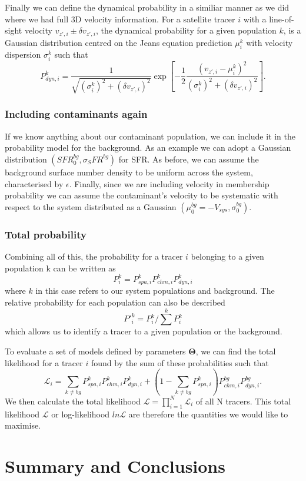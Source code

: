 Finally we can define the dynamical probability in a similiar manner as we did where we had full 3D velocity information. For a satellite tracer $i$ with a line-of-sight velocity $v_{z',i} \pm \delta v_{z',i}$, the dynamical probability for a given population $k$, is a Gaussian distribution centred on the Jeans equation prediction $\mu^k_i$ with velocity dispersion $\sigma^k_i$ such that
\begin{equation}
P^k_{dyn,i} = \frac{1}{\sqrt{(\sigma^k_i)^2+ (\delta v_{z',i})^2}} \exp{\left[-\frac{1}{2}\frac{(v_{z',i}-\mu^k_i)^2}{(\sigma^k_i)^2 + (\delta v_{z',i})^2}\right]}.
\end{equation}
\subsubsection{Including contaminants again}
If we know anything about our contaminant population, we can include it in the probability model for the background. As an example we can adopt a Gaussian distribution $(SFR_0^{bg},\sigma_SFR^{bg})$ for SFR. As before, we can assume the background surface number density to be uniform across the system, characterised by $\epsilon$. Finally, since we are including velocity in membership probability we can assume the contaminant's velocity to be systematic with respect to the system distributed as a Gaussian $(\mu_0^{bg}=-V_{sys},\sigma_0^{bg})$. 
\subsubsection{Total probability}
Combining all of this, the probability for a tracer $i$ belonging to a given population k can be written as
\begin{equation}
P_i^{k} = P_{spa,i}^k P_{chm,i}^k P_{dyn,i}^k 
\end{equation}
where $k$ in this case refers to our system populations and background. The relative probability for each population can also be described 
\begin{equation}
P'^k_i = P^k_i / \sum^k P^k_i
\end{equation}
which allows us to identify a tracer to a given population or the background.

To evaluate a set of models defined by parameters $\boldsymbol{\Theta}$, we can find the total likelihood for a tracer $i$ found by the sum of these probabilities such that
\begin{equation}
\mathcal{L}_i = \sum_{k \neq bg} P^{k}_{spa,i} P^{k}_{chm,i} P^{k}_{dyn,i} + \left(1 - \sum_{k \neq bg} P^{k}_{spa,i} \right) P^{bg}_{chm,i} P^{bg}_{dyn,i}.
\end{equation}
We then calculate the total likelihood $\mathcal{L} = \prod^N_{i=1} \mathcal{L}_i$ of all N tracers. This total likelihood $\mathcal{L}$ or log-likelihood $ln \mathcal{L}$ are therefore the quantities we would like to maximise.

\section{Summary and Conclusions} \label{sec:dyn_mod_conclusions}